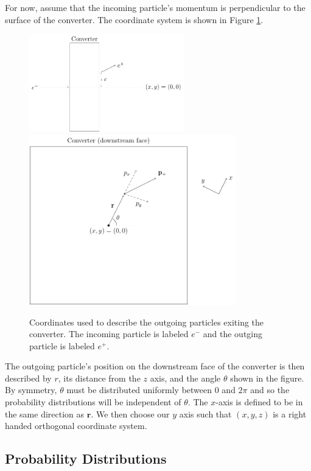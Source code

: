 \documentclass[12pt]{article}
\newcommand{\rrr}{\mathbf{r}}
\begin{document}
For now, assume that the incoming particle's momentum is perpendicular to the surface of the
converter. The coordinate system is shown in Figure \ref{fig:coords}.
\begin{figure}
\centering
\includegraphics[width=0.6\textwidth]{coords1.pdf}
\includegraphics[width=0.8\textwidth]{coords2.pdf}
\caption{Coordinates used to describe the outgoing particles exiting the converter. The incoming particle is 
labeled $e^-$ and the outging particle is labeled $e^+$.}
\label{fig:coords}
\end{figure}
The outgoing particle's position on the downstream face of the converter is then described by $r$,
its distance from the $z$ axis, and the angle $\theta$ shown in the figure. By symmetry, $\theta$
must be distributed uniformly between $0$ and $2\pi$ and so the probability distributions will be
independent of $\theta$. The $x$-axis is defined to be in the same direction as $\rrr$. We then
choose our $y$ axis such that $(x,y,z)$ is a right handed orthogonal coordinate system.

\subsection{Probability Distributions}
\end{document}
